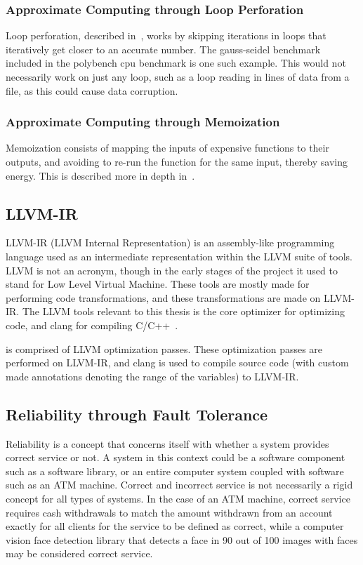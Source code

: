 \subsubsection{Approximate Computing through Loop Perforation}

Loop perforation, described in~\citet{li2018sculptor}, works by skipping iterations in loops that iteratively get closer to an accurate number. The gauss-seidel benchmark included in the polybench cpu benchmark\citep{polybench} is one such example. This would not necessarily work on just any loop, such as a loop reading in lines of data from a file, as this could cause data corruption.

\subsubsection{Approximate Computing through Memoization}

Memoization consists of mapping the inputs of expensive functions to their outputs, and avoiding to re-run the function for the same input, thereby saving energy. This is described more in depth in~\citet{mittal2016survey}.

\subsection{LLVM-IR}
LLVM-IR (LLVM Internal Representation) is an assembly-like programming language used as an intermediate representation within the LLVM suite of tools. LLVM is not an acronym, though in the early stages of the project it used to stand for Low Level Virtual Machine. These tools are mostly made for performing code transformations, and these transformations are made on LLVM-IR. The LLVM tools relevant to this thesis is the core optimizer for optimizing code, and clang for compiling C/C++~\citep{LLVM_homepage}.  %

\taffo{} is comprised of LLVM optimization passes. These optimization passes are performed on LLVM-IR, and clang is used to compile source code (with custom made annotations denoting the range of the variables) to LLVM-IR. %



\subsection{Reliability through Fault Tolerance}\label{section:Reliability_thorugh_fault_tolerance}
Reliability is a concept that concerns itself with whether a system provides correct service or not. A system in this context could be a software component such as a software library, or an entire computer system coupled with software such as an ATM machine. Correct and incorrect service is not necessarily a rigid concept for all types of systems. In the case of an ATM machine, correct service requires cash withdrawals to match the amount withdrawn from an account exactly for all clients for the service to be defined as correct, while a computer vision face detection library that detects a face in 90 out of 100 images with faces may be considered correct service.

